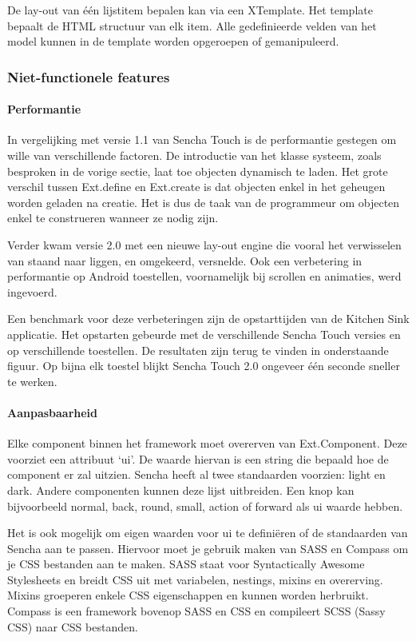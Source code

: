 De lay-out van één lijstitem bepalen kan via een XTemplate.  Het template bepaalt de HTML structuur van elk item.  Alle gedefinieerde velden van het model kunnen in de template worden opgeroepen of gemanipuleerd.

\subsubsection{Niet-functionele features}
\paragraph{Performantie}
In vergelijking met versie 1.1 van Sencha Touch is de performantie gestegen om wille van verschillende factoren.  De introductie van het klasse systeem,  zoals besproken in de vorige sectie,  laat toe objecten dynamisch te laden.  Het grote verschil tussen Ext.define en Ext.create is dat objecten enkel in het geheugen worden geladen na creatie.  Het is dus de taak van de programmeur om objecten enkel te construeren wanneer ze nodig zijn.

Verder kwam versie 2.0 met een nieuwe lay-out engine die vooral het verwisselen van staand naar liggen,  en omgekeerd,  versnelde.  Ook een verbetering in performantie op Android toestellen,  voornamelijk bij scrollen en animaties,  werd ingevoerd.

Een benchmark voor deze verbeteringen zijn de opstarttijden van de Kitchen Sink applicatie.  Het opstarten gebeurde met de verschillende Sencha Touch versies en op verschillende toestellen.  De resultaten zijn terug te vinden in onderstaande figuur.  Op bijna elk toestel blijkt Sencha Touch 2.0 ongeveer één seconde sneller te werken.

\paragraph{Aanpasbaarheid}
Elke component binnen het framework moet overerven van Ext.Component.  Deze voorziet een attribuut ‘ui'.  De waarde hiervan is een string die bepaald hoe de component er zal uitzien.  Sencha heeft al twee standaarden voorzien:  light en dark.  Andere componenten kunnen deze lijst uitbreiden.  Een knop kan bijvoorbeeld normal,  back,  round,  small,  action of forward als ui waarde hebben.

Het is ook mogelijk om eigen waarden voor ui te definiëren of de standaarden van Sencha aan te passen.  Hiervoor moet je gebruik maken van SASS en Compass om je CSS bestanden aan te maken.  SASS staat voor Syntactically Awesome Stylesheets en breidt CSS uit met variabelen,  nestings,  mixins en overerving.  Mixins groeperen enkele CSS eigenschappen en kunnen worden herbruikt.  Compass is een framework bovenop SASS en CSS en compileert SCSS (Sassy CSS) naar CSS bestanden.        

